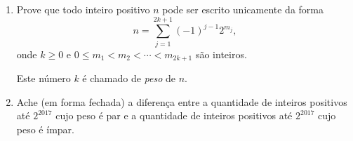 \begin{enumerate}[label=(\alph*)]
	\item Prove que todo inteiro positivo $n$ pode ser escrito unicamente da forma \[n=\sum_{j=1}^{2k+1}(-1)^{j-1}2^{m_j},\] onde $k\geq 0$ e $0\le m_1<m_2<\cdots <m_{2k+1}$ são inteiros.
	
		Este número \(k\) é chamado de \emph{peso} de \(n\).
	
	\item Ache (em forma fechada) a diferença entre a quantidade de inteiros positivos até \(2^{2017}\) cujo peso é par e a quantidade de inteiros positivos até \(2^{2017}\) cujo peso é ímpar.
\end{enumerate}
